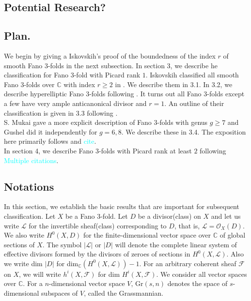 \documentclass[11pt]{amsart}
\theoremstyle{plain}
\theoremstyle{definition}
\theoremstyle{expl}
\begin{document}
\subsection{Potential Research?}

\subsection{Plan.} We begin by giving a Iskovskih's proof of the boundedness of the index $r$ of smooth Fano $3$-folds in the next subsection. In section 3, we describe he classification for Fano $3$-fold with Picard rank $1$. Iskovskih classified all smooth Fano $3$-folds over $\mathbb{C}$ with index $r\geq 2$ in \cite{Isk77}.  We describe them in 3.1. In 3.2, we describe hyperelliptic Fano $3$-folds following \cite{Isk77}. It turns out all Fano $3$-folds except a few have very ample anticanonical divisor and $r=1$. An outline of their classification is given in 3.3 following \cite{Isk78}.\\
S. Mukai gave a more explicit description of Fano $3$-folds with genus $g\geq 7$ and Gushel did it independently for $g=6,8$. We describe these in 3.4. The exposition here primarily follows \cite{Muk89} and \textcolor{cyan}{cite}.\\
In section 4, we describe Fano $3$-folds with Picard rank at least $2$ following \textcolor{cyan}{Multiple citations}. 

\subsection{Notations}
In this section, we establish the basic results that are important for subsequent classification. 
Let $X$ be a Fano $3$-fold. 
Let $D$ be a divisor(class) on $X$ and let us write $\mathcal{L}$ for the invertible sheaf(class) corresponding to $D$, that is, $\mathcal{L} = \mathcal{O}_X(D)$. We also write $H^0(X,D)$ for the finite-dimensional vector space over $\mathbb{C}$ of global sections of $X$.
The symbol $|\mathcal{L}|$ or $|D|$ will denote the complete linear system of effective divisors formed by the divisors of zeroes of sections in $H^0(X,\mathcal{L})$. Also we write dim $|D|$ for dim$_{\mathbb{C}}(H^0(X,\mathcal{L})) -1$.
For an arbitrary coherent sheaf $\mathcal{F}$ on $X$, we will write $h^i(X,\mathcal{F})$ for dim $H^i(X,\mathcal{F})$. We consider all vector spaces over $\mathbb{C}$. For a $n$-dimensional vector space $V$, Gr$(s,n)$ denotes the space of $s$-dimensional subspaces of $V$, called the Grassmannian.\\
\end{document}
